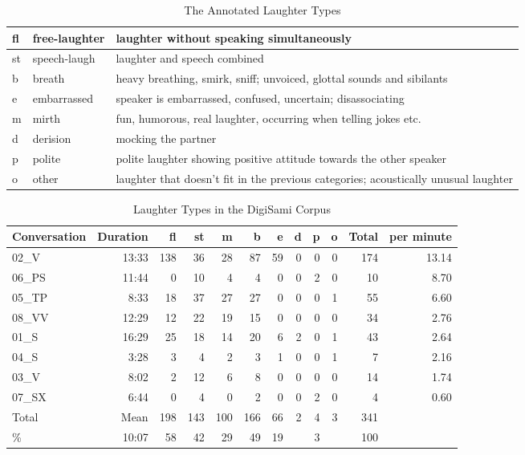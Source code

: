 \documentclass[10pt,journal,compsoc]{IEEEtran}
\begin{document}
\begin{table}[!t]
\caption{The Annotated Laughter Types}
\label{tab:laughter-types}
\centering
\begin{tabular}{| p{0.2cm} | p{1.7cm} | p{12cm} |}
\hline
fl	& free-laughter	& laughter without speaking simultaneously \\ \hline
st	& speech-laugh	& laughter and speech combined \\ \hline
b	& breath	    & heavy breathing, smirk, sniff; unvoiced, glottal sounds and sibilants \\ \hline
e	& embarrassed	& speaker is embarrassed, confused, uncertain; disassociating  \\ \hline
m	& mirth	        & fun, humorous, real laughter, occurring when telling jokes etc. \\ \hline
d	& derision	    & mocking the partner \\ \hline
p	& polite	    & polite laughter showing positive attitude towards the other speaker \\ \hline
o	& other    	    & laughter that doesn't fit in the previous categories; acoustically unusual laughter\\ \hline
\end{tabular}
\end{table}

\begin{table}[!t]
\caption{Laughter Types in the DigiSami Corpus}
\label{tab:laughter-digisami}
\centering
\begin{tabular}{| l | r | r r | r r r r r r | r | r |}
\hline
Conversation & Duration & fl  & st & m & b & e & d & p & o & Total & per minute \\
\hline
02\_V  & 13:33 & 138 & 36 & 28 & 87 & 59 & 0 & 0 & 0 & 174 & 13.14 \\
06\_PS & 11:44 &   0 & 10 &  4 &  4 &  0 & 0 & 2 & 0 &  10 &  8.70 \\
05\_TP &  8:33 &  18 & 37 & 27 & 27 &  0 & 0 & 0 & 1 &  55 &  6.60 \\
08\_VV & 12:29 &  12 & 22 & 19 & 15	&  0 & 0 & 0 & 0 &  34 &  2.76 \\
01\_S  & 16:29 &  25 & 18 & 14 & 20 &  6 & 2 & 0 & 1 &  43 &  2.64 \\
04\_S  &  3:28 &   3 &  4 &  2 &  3 &  1 & 0 & 0 & 1 &   7 &  2.16 \\
03\_V  &  8:02 &   2 & 12 &  6 &  8 &  0 & 0 & 0 & 0 &  14 &  1.74 \\
07\_SX &  6:44 &   0 &  4 &  0 &  2	&  0 & 0 & 2 & 0 &   4 &  0.60 \\
\hline
Total  & Mean  & 198 & 143 & 100 & 166 & 66 & 2 & 4 & 3 & 341 & \\
\%     & 10:07 &  58 &  42 &  29 &  49 & 19 & & 3 &	& 100 & \\
\hline
\end{tabular}
\end{table}
\end{document}
